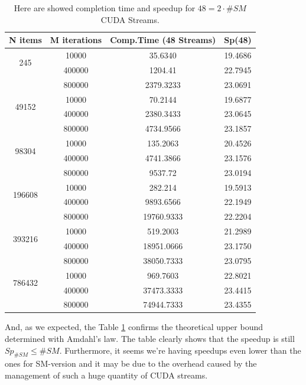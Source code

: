 \begin{table}	
	\centering
	\begin{tabular}{ | c  c || c | c | } 
		\hline
		  N items & M iterations & Comp.Time (48 Streams) & Sp(48) \\ [0.5ex]
		\hline	
		\hline	
	
		\multirow{2}{*}{245}&	10000&	35.6340&	19.4686\\
		& 	400000&	1204.41&	22.7945\\
		&	800000&	2379.3233&	23.0691\\
		\hline
		\multirow{2}{*}{49152}&	10000&	70.2144&	19.6877\\
		&	400000&	2380.3433&	23.0645\\
		&	800000&	4734.9566&	23.1857\\
		\hline
		\multirow{2}{*}{98304}&	10000&	135.2063&	20.4526\\
		&	400000&	4741.3866&	23.1576\\
		&	800000&	9537.72&	23.0194\\
		\hline
		\multirow{2}{*}{196608}&	10000&	282.214&	19.5913\\
		&	400000&	9893.6566&	22.1949\\
		&	800000&	19760.9333&	22.2204\\
		\hline
		\multirow{2}{*}{393216}&	10000&	519.2003&	21.2989\\
		&	400000&	18951.0666&	23.1750\\
		&	800000&	38050.7333&	23.0795\\
		\hline
		\multirow{2}{*}{786432}&	10000&	969.7603&	22.8021\\
		&	400000&	37473.3333&	23.4415\\
		&	800000&	74944.7333&	23.4355\\

		
		\hline
		
		
	\end{tabular}
	\caption{Here are showed completion time and speedup for \(48 = 2 \cdot \#SM\) CUDA Streams. }	
	\label{tab:cosdoublestream}		
\end{table}


And, as we expected, the Table \ref{tab:cosdoublestream} confirms the theoretical upper bound determined with Amdahl's law. The table clearly shows that the speedup is still \(Sp_{\#SM}\leq\#SM\).
Furthermore, it seems we're having speedups even lower than the ones for SM-version and it may be due to the overhead caused by the management of such a huge quantity of CUDA streams.





